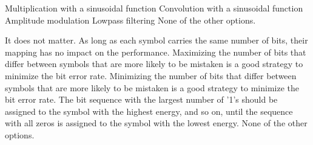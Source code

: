 \begin{checkboxes}
    \CorrectChoice Multiplication with a sinusoidal function
    \choice Convolution with a sinusoidal function
    \choice Amplitude modulation
    \choice Lowpass filtering
    \choice None of the other options.
\end{checkboxes}

\begin{checkboxes}
    \choice It does not matter. As long as each symbol carries the same number of bits, their mapping has no impact on the performance.
    \choice Maximizing the number of bits that differ between symbols that are more likely to be mistaken is a good strategy to minimize the bit error rate.
    \CorrectChoice Minimizing the number of bits that differ between symbols that are more likely to be mistaken is a good strategy to minimize the bit error rate.
    \choice The bit sequence with the largest number of '1's should be assigned to the symbol with the highest energy, and so on, until the sequence with all zeros is assigned to the symbol with the lowest energy.
    \choice None of the other options.
\end{checkboxes}
